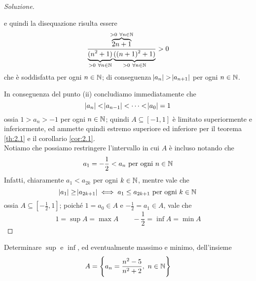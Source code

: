 \begin{proof}[Soluzione]
\begin{enumerate}[(i)]
\[        \]
        e quindi la disequazione risulta essere
        \[
        \frac{\overbrace{2n+1}^{>0 \ \forall n\in\amsbb{N}}}{\underbrace{(n^2+1)}_{>0 \ \forall n\in\amsbb{N}}\underbrace{((n+1)^2+1)}_{>0 \ \forall n\in\amsbb{N}}}>0
        \]
        che è soddisfatta per ogni $n\in\amsbb{N}$; di conseguenza $\abs{a_n}>\abs{a_{n+1}}$ per ogni $n\in\amsbb{N}$.
    \end{enumerate}
    In conseguenza del punto (ii) concludiamo immediatamente che
    \[
    \abs{a_n}< \abs{a_{n-1}}<\dots < \abs{a_0} = 1
    \]
    ossia $1>a_n>-1$ per ogni $n\in\amsbb{N}$; quindi $A\subseteq [-1,1]$ è limitato superiormente e inferiormente, ed ammette quindi estremo superiore ed inferiore per il teorema \ref{th:2.1} e il corollario \ref{cor:2.1}.\\
    Notiamo che possiamo restringere l'intervallo in cui $A$ è incluso notando che
    \[
    a_1 = -\frac{1}{2}<a_n \ \text{per ogni} \ n\in\amsbb{N}
    \]
    Infatti, chiaramente $a_1 <a_{2k}$ per ogni $k\in\amsbb{N}$, mentre vale che
    \[
    \abs{a_1} \ge \abs{a_{2k+1}} \iff a_1 \le a_{2k+1} \ \text{per ogni} \ k\in\amsbb{N}
    \]
    ossia $A\subseteq \left[-\frac{1}{2}, 1\right]$; poiché $1=a_0\in A$ e $-\frac{1}{2}=a_1\in A$, vale che
    \[
    1 = \sup A = \max A \qquad -\frac{1}{2} = \inf A = \min A
    \]
\end{proof}
\begin{exercise}
    \label{ex:2.2}
    Determinare $\sup$ e $\inf$, ed eventualmente massimo e minimo, dell'insieme
    \[
    A = \left\{ a_n = \frac{n^2-5}{n^2+2}, \ n\in\amsbb{N}\right\}
    \]
\end{exercise}
